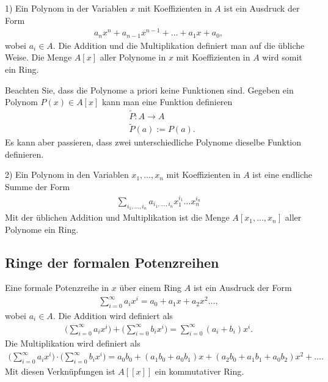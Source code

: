 \documentclass[reqno,12pt]{article}
\numberwithin{equation}{section}
\newcommand{\wt}{\widetilde}
\theoremstyle{plain}
\theoremstyle{definition}
\begin{document}
\medskip

1)  Ein Polynom in der Variablen $x$ mit Koeffizienten in $A$ ist ein Ausdruck der Form
\begin{align*}
  a_n x^n + a_{n-1} x^{n-1} + \dots + a_1 x + a_0,
\end{align*}
wobei $a_i \in A$. Die Addition und die Multiplikation definiert man auf die übliche Weise. Die Menge $A[x]$ aller Polynome in $x$ mit Koeffizienten in $A$ wird somit ein Ring.

Beachten Sie, dass die Polynome a priori keine Funktionen sind. Gegeben ein Polynom $P(x) \in A[x]$ kann man eine Funktion definieren
\begin{align*}
& \wt{P} \colon A \to A \\
&  \wt{P}(a):= P(a).
\end{align*}
Es kann aber passieren, dass zwei unterschiedliche Polynome dieselbe Funktion definieren.

\medskip

2) Ein Polynom in den Variablen $x_1, \dots, x_n$ mit Koeffizienten in $A$ ist eine endliche Summe der Form
\begin{align*}
  \sum_{i_1, \dots, i_n}  a_{i_1, \dots, i_n} x_1^{i_1} \dots x_n^{i_n}
\end{align*}
Mit der üblichen Addition und Multiplikation ist die Menge $A[x_1, \dots, x_n]$ aller Polynome ein Ring.



\subsection{Ringe der formalen Potenzreihen}

Eine formale Potenzreihe in $x$ über einem Ring $A$ ist ein Ausdruck der Form
\begin{align*}
\sum_{i=0}^{\infty} a_i x^i = a_0 + a_1x+a_2x^2 \dots ,
\end{align*}
wobei $a_i \in A$. Die Addition wird definiert als
\begin{align*}
  \Big(\sum_{i=0}^{\infty} a_i x^i \Big) + \Big(\sum_{i=0}^{\infty} b_i x^i\Big) = \sum_{i=0}^{\infty} (a_i+b_i) x^i.
\end{align*}
Die Multiplikation wird definiert als
\begin{align*}
  \Big(\sum_{i=0}^{\infty} a_i x^i \Big) \cdot \Big(\sum_{i=0}^{\infty} b_i x^i\Big) = a_0b_0 + (a_1b_0 + a_0b_1)x + (a_2b_0 + a_1b_1 + a_0b_2)x^2 + \dots.
\end{align*}
Mit diesen Verknüpfungen ist $A[[x]]$ ein kommutativer Ring.
\end{document}
